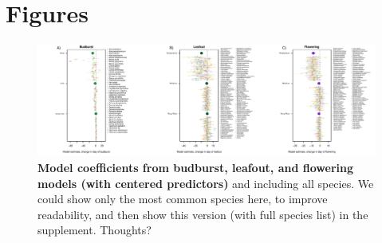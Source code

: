 \documentclass{article}
\begin{document}






\section*{Figures}


\begin{figure}[h]
\centering
 \includegraphics{../../Analyses/soilmoisture/figures/m5_bbdlofl.pdf}
 \caption{\textbf{Model coefficients from budburst, leafout, and flowering models (with centered predictors)} and including all species. We could show only the most common species here, to improve readability, and then show this version (with full species list) in the supplement. Thoughts?} 
 \label{fig:bblofl}
 \end{figure}
 
\end{document}
